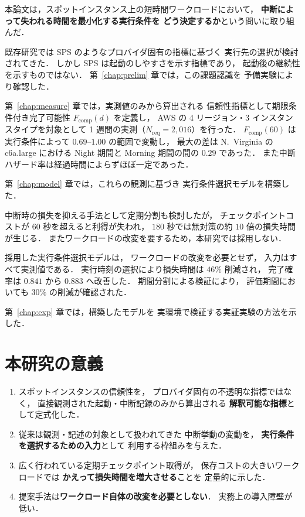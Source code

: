 \documentclass[11pt,a4paper]{ltjsreport}
\newcommand{\Fcomp}{F_{\mathrm{comp}}}
\newcommand{\Nreq}{N_{\mathrm{req}}}
\begin{document}
本論文は，スポットインスタンス上の短時間ワークロードにおいて，
\textbf{中断によって失われる時間を最小化する実行条件を
どう決定するか}という問いに取り組んだ．

既存研究では SPS のようなプロバイダ固有の指標に基づく
実行先の選択が検討されてきた．
しかし SPS は起動のしやすさを示す指標であり，
起動後の継続性を示すものではない．
第~\ref{chap:prelim} 章では，この課題認識を
予備実験により確認した．

第~\ref{chap:measure} 章では，実測値のみから算出される
信頼性指標として期限条件付き完了可能性 $\Fcomp(d)$ を定義し，
AWS の 4 リージョン・3 インスタンスタイプを対象として
1 週間の実測（$\Nreq = 2{,}016$）を行った．
$\Fcomp(60)$ は実行条件によって $0.69$--$1.00$ の範囲で変動し，
最大の差は N.~Virginia の c6a.large における
Night 期間と Morning 期間の間の $0.29$ であった．
また中断ハザード率は経過時間によらずほぼ一定であった．

第~\ref{chap:model} 章では，これらの観測に基づき
実行条件選択モデルを構築した．

中断時の損失を抑える手法として定期分割も検討したが，
チェックポイントコストが $60$ 秒を超えると利得が失われ，
$180$ 秒では無対策の約 $10$ 倍の損失時間が生じる．
またワークロードの改変を要するため，本研究では採用しない．

採用した実行条件選択モデルは，
ワークロードの改変を必要とせず，
入力はすべて実測値である．
実行時刻の選択により損失時間は $46\%$ 削減され，
完了確率は $0.841$ から $0.883$ へ改善した．
期間分割による検証により，
評価期間においても $30\%$ の削減が確認された．

第~\ref{chap:exp} 章では，構築したモデルを
実環境で検証する実証実験の方法を示した．

\section{本研究の意義}

\begin{enumerate}
  \item スポットインスタンスの信頼性を，
        プロバイダ固有の不透明な指標ではなく，
        直接観測された起動・中断記録のみから算出される
        \textbf{解釈可能な指標}として定式化した．
  \item 従来は観測・記述の対象として扱われてきた
        中断挙動の変動を，
        \textbf{実行条件を選択するための入力}として
        利用する枠組みを与えた．
  \item 広く行われている定期チェックポイント取得が，
        保存コストの大きいワークロードでは
        \textbf{かえって損失時間を増大させる}ことを
        定量的に示した．
  \item 提案手法は\textbf{ワークロード自体の改変を必要としない}．
        実務上の導入障壁が低い．
\end{enumerate}
\end{document}

